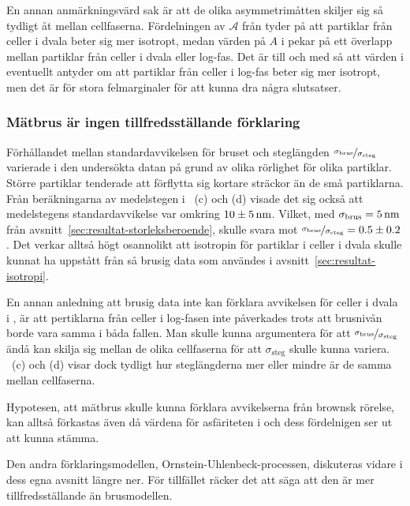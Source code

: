 En annan anmärkningsvärd sak är att de olika asymmetrimåtten skiljer sig så tydligt åt mellan cellfaserna. Fördelningen av $\mathcal{A}$ från  tyder på att partiklar från celler i dvala beter sig mer isotropt, medan värden på $A$ i  pekar på ett överlapp mellan partiklar från celler i dvala eller log-fas. Det är till och med så att värden i  eventuellt antyder om att partiklar från celler i log-fas beter sig mer isotropt, men det är för stora felmarginaler för att kunna dra några slutsatser.

\subsubsection{Mätbrus är ingen tillfredsställande förklaring}
Förhållandet mellan standardavvikelsen för bruset och steglängden $\nicefrac{\sigma_\text{brus}}{\sigma_\text{steg}}$ varierade i den undersökta datan på grund av olika rörlighet för olika partiklar. Större partiklar tenderade att förflytta sig kortare sträckor än de små partiklarna. Från beräkningarna av medelstegen i ~(c) och (d) visade det sig också att medelstegens standardavvikelse var omkring $\unit[10\pm 5]{nm}$. Vilket, med $\sigma_\text{brus}=\unit[5]{nm}$ från avsnitt~\ref{sec:resultat-storleksberoende}, skulle svara mot $\nicefrac{\sigma_\text{brus}}{\sigma_\text{steg}}=0.5\pm 0.2$. Det verkar alltså högt osannolikt att isotropin för partiklar i celler i dvala skulle kunnat ha uppstått från så brusig data som användes i avsnitt~\ref{sec:resultat-isotropi}. 

En annan anledning att brusig data inte kan förklara avvikelsen för celler i dvala i , är att pertiklarna från celler i log-fasen inte påverkades trots att brusnivån borde vara samma i båda fallen. Man skulle kunna argumentera för att $\nicefrac{\sigma_\text{brus}}{\sigma_\text{steg}}$ ändå kan skilja sig mellan de olika cellfaserna för att $\sigma_\text{steg}$ skulle kunna variera. ~(c) och (d) visar dock tydligt hur steglängderna mer eller mindre är de samma mellan cellfaserna.

Hypotesen, att mätbrus skulle kunna förklara avvikelserna från brownsk rörelse, kan alltså förkastas även då värdena för asfäriteten i  och dess fördelnigen  ser ut att kunna stämma. 

Den andra förklaringsmodellen, Ornstein-Uhlenbeck-processen, diskuteras vidare i dess egna avsnitt längre ner. För tillfället räcker det att säga att den är mer tillfredsställande än brusmodellen. 



